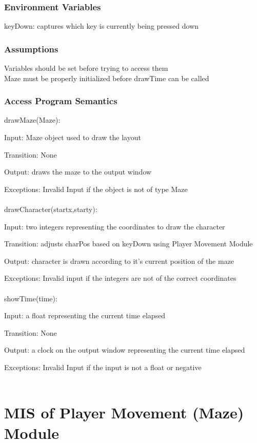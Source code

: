 \documentclass[12pt, titlepage]{article}
\begin{document}
		\subsubsection{Environment Variables}
		keyDown: captures which key is currently being pressed down
		\subsubsection{Assumptions}
		Variables should be set before trying to access them \\ 
		Maze must be properly initialized before drawTime can be called
		
		\subsubsection{Access Program Semantics}
		
		drawMaze(Maze):
		
		Input: Maze object used to draw the layout
		
		Transition: None
		
		Output: draws the maze to the output window
		
		Exceptions: Invalid Input if the object is not of type Maze\\
		\\
		drawCharacter(startx,starty):
		
		Input: two integers representing the coordinates to draw the character
		
		Transition: adjusts charPos based on keyDown using Player Movement Module
		
		Output: character is drawn according to it's current position of the maze
		
		Exceptions: Invalid input if the integers are not of the correct coordinates\\
		\\
		showTime(time):
		
		Input: a float representing the current time elapsed
		
		Transition: None
		
		Output: a clock on the output window representing the current time elapsed
		
		Exceptions: Invalid Input if the input is not a float or negative\\
		\\
		
\section{MIS of Player Movement (Maze) Module}
\end{document}
